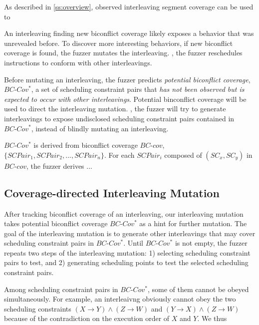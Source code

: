 %
As described in \autoref{ss:overview}, observed interleaving segment
coverage can be used to

\dr{}

An interleaving finding new biconflict coverage likely exposes a
behavior that was unrevealed before.
%
To discover more interesting behaviors, if new biconflict coverage is
found, the fuzzer mutates the interleaving. \ie, the fuzzer
reschedules instructions to conform with other interleavings.

Before mutating an interleaving, the fuzzer predicts \textit{potential
  biconflict coverage}, $BC\mbox{-}Cov^*$, a set of scheduling
constraint pairs that \textit{has not been observed but is expected to
  occur with other interleavings}.
%
Potential binconflict coverage will be used to direct the interleaving
mutation. \ie, the fuzzer will try to generate interleavings to expose
undisclosed scheduling constraint pairs contained in
$BC\mbox{-}Cov^*$, instead of blindly mutating an interleaving.


$BC\mbox{-}Cov^*$ is derived from biconflict coverage $BC\mbox{-}cov$,
$\{SCPair_1, SCPair_2, ..., SCPair_n\}$.
%
For each $SCPair_i$ composed of $(SC_x, SC_y)$ in $BC\mbox{-}cov$, the
fuzzer derives ...



\subsection{Coverage-directed Interleaving Mutation}
\label{ss:scheduler}

\newcommand{\segment}{segment graph\xspace}
\newcommand{\segments}{segment graphs\xspace}
\newcommand{\Segments}{Segment graphs\xspace}


After tracking biconflict coverage of an interleaving, our
interleaving mutation takes potential biconflict coverage
$BC\mbox{-}Cov^*$ as a hint for further mutation.
%
The goal of the interleaving mutation is to generate other
interleavings that may cover scheduling constraint pairs in
$BC\mbox{-}Cov^*$.
%
Until $BC\mbox{-}Cov^*$ is not empty, the fuzzer repeats two steps of
the interleaving mutation:
%
1) selecting scheduling constraint pairs to test, and
2) generating scheduling points to test the selected scheduling
constraint pairs.


%
Among scheduling constraint pairs in $BC\mbox{-}Cov^*$, some of them
cannot be obeyed simultaneously.
%
For example, an interleaivng obviously cannot obey the two scheduling
constraints $(X \rightarrow Y)\wedge (Z \rightarrow W)$ and
$(Y \rightarrow X)\wedge (Z \rightarrow W)$ because of the
contradiction on the execution order of $X$ and $Y$.
%
We thus 


